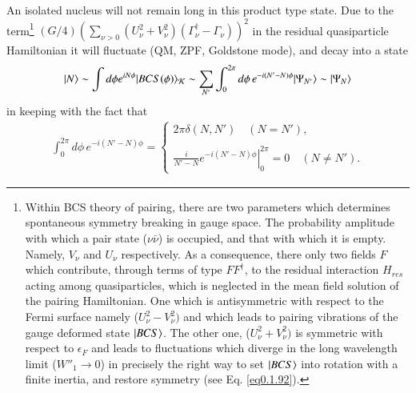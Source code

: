 An isolated nucleus will not remain long in this product type state. Due to the term\footnote{Within BCS theory of pairing, there are two parameters which determines spontaneous symmetry breaking in gauge space. The probability amplitude with which a pair state ($\nu\bar{\nu}$) is occupied, and that with which it is empty. Namely, $V_\nu$ and $U_\nu$ respectively. As a consequence, there only two fields $F$ which contribute, through terms of type $FF^\dagger$, to the residual interaction $H_{res}$ acting among quasiparticles, which is neglected in the mean field solution of the pairing Hamiltonian. One which is antisymmetric with respect to the Fermi surface namely ($U^2_\nu-V^2_\nu)$ and which leads to pairing vibrations of the gauge deformed state $|{BCS} \rangle$. The other one, ($U^2_\nu+V^2_\nu)$ is symmetric with respect to $\epsilon_F$ and leads to fluctuations which diverge in the long wavelength limit ($W''_1\to0$) in precisely the right way to set $|{BCS} \rangle$ into rotation with a finite inertia, and restore symmetry (see Eq. \ref{eq0.1.92}).}  $(G/4)\left(\sum_{\nu>0}\left(U^2_\nu+V^2_\nu\right)\left(\Gamma_\nu^\dagger-\Gamma_\nu\right)\right)^2$ in the residual quasiparticle Hamiltonian it will fluctuate (QM, ZPF, Goldstone mode), and decay into a state
\begin{align}\label{eqbeta}
|N\rangle \sim \int d\phi e^{iN\phi}|BCS(\phi)\rangle_{\mathcal{K}}\sim \sum_{N'}\int_0^{2\pi}d\phi\, e^{-i(N'-N)\phi}|{\Psi_{N'}} \rangle\sim|{\Psi_{N}} \rangle
\end{align}
in keeping with the fact that
\begin{align}\label{eq3.7.27}
\int_0^{2\pi}d\phi\, e^{-i(N'-N)\phi}=\left\{
\begin{array}{c}
 2\pi\delta(N,N')\quad (N=N'),\\ 
 \\
\left.\frac{i}{N'-N}e^{-i(N'-N)\phi}\right|^{2\pi}_0=0\quad (N\neq N').
\end{array} \right.
\end{align}
